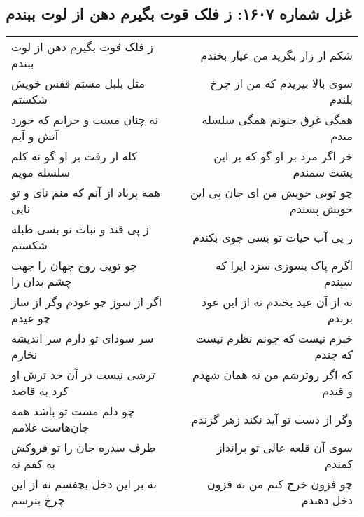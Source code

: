 \begin{center}
\section*{غزل شماره ۱۶۰۷: ز فلک قوت بگیرم دهن از لوت ببندم}
\label{sec:1607}
\begin{longtable}{l p{0.5cm} r}
ز فلک قوت بگیرم دهن از لوت ببندم
&&
شکم ار زار بگرید من عیار بخندم
\\
مثل بلبل مستم قفس خویش شکستم
&&
سوی بالا بپریدم که من از چرخ بلندم
\\
نه چنان مست و خرابم که خورد آتش و آبم
&&
همگی غرق جنونم همگی سلسله مندم
\\
کله ار رفت بر او گو نه کلم سلسله مویم
&&
خر اگر مرد بر او گو که بر این پشت سمندم
\\
همه پرباد از آنم که منم نای و تو نایی
&&
چو تویی خویش من ای جان پی این خویش پسندم
\\
ز پی قند و نبات تو بسی طبله شکستم
&&
ز پی آب حیات تو بسی جوی بکندم
\\
چو تویی روح جهان را جهت چشم بدان را
&&
اگرم پاک بسوزی سزد ایرا که سپندم
\\
اگر از سوز چو عودم وگر از ساز چو عیدم
&&
نه از آن عید بخندم نه از این عود برندم
\\
سر سودای تو دارم سر اندیشه نخارم
&&
خبرم نیست که چونم نظرم نیست که چندم
\\
ترشی نیست در آن خد ترش او کرد به قاصد
&&
که اگر روترشم من نه همان شهدم و قندم
\\
چو دلم مست تو باشد همه جان‌هاست غلامم
&&
وگر از دست تو آید نکند زهر گزندم
\\
طرف سدره جان را تو فروکش به کفم نه
&&
سوی آن قلعه عالی تو برانداز کمندم
\\
نه بر این دخل بچفسم نه از این چرخ بترسم
&&
چو فزون خرج کنم من نه فزون دخل دهندم
\\
\end{longtable}
\end{center}
